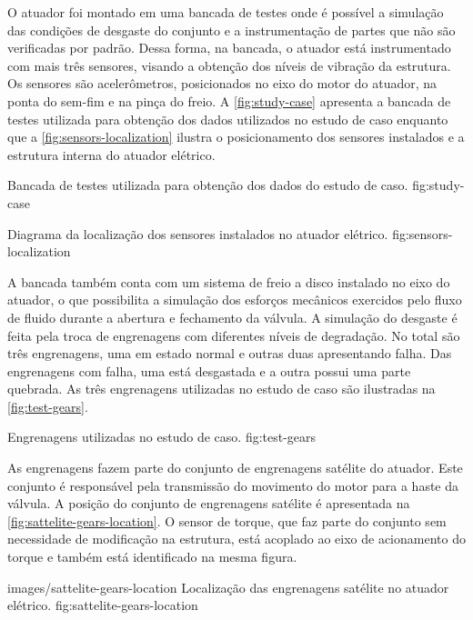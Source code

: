 O atuador foi montado em uma bancada de testes onde é possível a simulação das condições de desgaste
do conjunto e a instrumentação de partes que não são verificadas por padrão. Dessa forma, na
bancada, o atuador está instrumentado com mais três sensores, visando a obtenção dos níveis de
vibração da estrutura. Os sensores são acelerômetros, posicionados no eixo do motor do atuador, na
ponta do sem-fim e na pinça do freio. A \cref{fig:study-case} apresenta a bancada de testes
utilizada para obtenção dos dados utilizados no estudo de caso enquanto que a
\cref{fig:sensors-localization} ilustra o posicionamento dos sensores instalados e a estrutura
interna do atuador elétrico.


  {Bancada de testes utilizada para obtenção dos dados do estudo de caso.}
  {fig:study-case}

  {Diagrama da localização dos sensores instalados no atuador elétrico.}
  {fig:sensors-localization}

A bancada também conta com um sistema de freio a disco instalado no eixo do atuador, o que
possibilita a simulação dos esforços mecânicos exercidos pelo fluxo de fluido durante a abertura e
fechamento da válvula. A simulação do desgaste é feita pela troca de engrenagens com diferentes
níveis de degradação. No total são três engrenagens, uma em estado normal e outras duas apresentando
falha. Das engrenagens com falha, uma está desgastada e a outra possui uma parte quebrada. As três
engrenagens utilizadas no estudo de caso são ilustradas na \cref{fig:test-gears}.

  {Engrenagens utilizadas no estudo de caso.}
  {fig:test-gears}

As engrenagens fazem parte do conjunto de engrenagens satélite do atuador. Este conjunto é
responsável pela transmissão do movimento do motor para a haste da válvula. A posição do conjunto de
engrenagens satélite é apresentada na \cref{fig:sattelite-gears-location}. O sensor de torque, que
faz parte do conjunto sem necessidade de modificação na estrutura, está acoplado ao eixo de
acionamento do torque e também está identificado na mesma figura.

  {images/sattelite-gears-location}
  {Localização das engrenagens satélite no atuador elétrico.}
  {fig:sattelite-gears-location}


